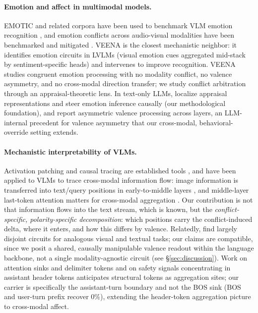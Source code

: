\documentclass{article}
\begin{document}
\paragraph{Emotion and affect in multimodal models.}
EMOTIC and related corpora have been used to benchmark VLM emotion recognition \citep{kosti2019, etesam2024, agarwal2026}, and emotion conflicts across audio-visual modalities have been benchmarked and mitigated \citep{mosear2025, emomm2026}. VEENA \citep{veena2026} is the closest mechanistic neighbor: it identifies emotion circuits in LVLMs (visual emotion cues aggregated mid-stack by sentiment-specific heads) and intervenes to improve recognition. VEENA studies congruent emotion processing with no modality conflict, no valence asymmetry, and no cross-modal direction transfer; we study conflict arbitration through an appraisal-theoretic lens. In text-only LLMs, \citet{tak2025} localize appraisal representations and steer emotion inference causally (our methodological foundation), and \citet{negbeforepos2026} report asymmetric valence processing across layers, an LLM-internal precedent for valence asymmetry that our cross-modal, behavioral-override setting extends.

\paragraph{Mechanistic interpretability of VLMs.}
Activation patching and causal tracing are established tools \citep{meng2022, patchingbestpractices, attributionpatching}, and have been applied to VLMs to trace cross-modal information flow: image information is transferred into text/query positions in early-to-middle layers \citep{basu2024, whatsintheimage2025, narrowgate2024, towardsinterp2024}, and middle-layer last-token attention matters for cross-modal aggregation \citep{fcct2026}. Our contribution is not that information flows into the text stream, which is known, but the \emph{conflict-specific, polarity-specific decomposition}: which positions carry the conflict-induced delta, where it enters, and how this differs by valence. Relatedly, \citet{nikankin2025} find largely disjoint circuits for analogous visual and textual tasks; our claims are compatible, since we posit a shared, causally manipulable valence readout within the language backbone, not a single modality-agnostic circuit (see \S\ref{sec:discussion}). Work on attention sinks and delimiter tokens \citep{xiao2024, activedormant2024} and on safety signals concentrating in assistant header tokens \citep{ada2025} anticipates structural tokens as aggregation sites; our carrier is specifically the assistant-turn boundary and not the BOS sink (BOS and user-turn prefix recover $0\%$), extending the header-token aggregation picture to cross-modal affect.
\end{document}
